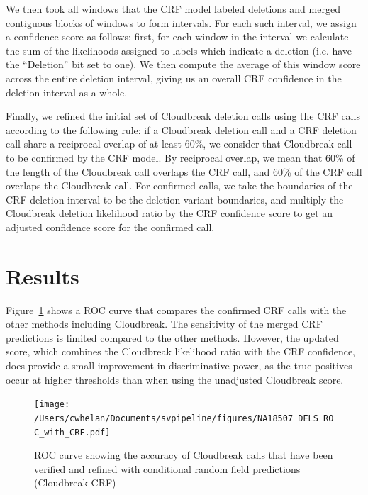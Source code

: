 We then took all windows that the CRF model labeled deletions and merged contiguous blocks of windows to form intervals. For each such interval, we assign a confidence score as follows: first, for each window in the interval we calculate the sum of the likelihoods assigned to labels which indicate a deletion (i.e. have the ``Deletion'' bit set to one). We then compute the average of this window score across the entire deletion interval, giving us an overall CRF confidence in the deletion interval as a whole.

Finally, we refined the initial set of Cloudbreak deletion calls using the CRF calls according to the following rule: if a Cloudbreak deletion call and a CRF deletion call share a reciprocal overlap of at least 60\%, we consider that Cloudbreak call to be confirmed by the CRF model. By reciprocal overlap, we mean that 60\% of the length of the Cloudbreak call overlaps the CRF call, and 60\% of the CRF call overlaps the Cloudbreak call. For confirmed calls, we take the boundaries of the CRF deletion interval to be the deletion variant boundaries, and multiply the Cloudbreak deletion likelihood ratio by the CRF confidence score to get an adjusted confidence score for the confirmed call.

\section{Results}

Figure~\ref{roc_NA18507_with_crf} shows a ROC curve that compares the confirmed CRF calls with the other methods including Cloudbreak. The sensitivity of the merged CRF predictions is limited compared to the other methods. However, the updated score, which combines the Cloudbreak likelihood ratio with the CRF confidence, does provide a small improvement in discriminative power, as the true positives occur at higher thresholds than when using the unadjusted Cloudbreak score.

\begin{figure}
\centering
\texttt{[image: /Users/cwhelan/Documents/svpipeline/figures/NA18507\_DELS\_ROC\_with\_CRF.pdf]}
\caption{ROC curve showing the accuracy of Cloudbreak calls that have been verified and refined with conditional random field predictions (Cloudbreak-CRF)}
\label{roc_NA18507_with_crf}
\end{figure}

